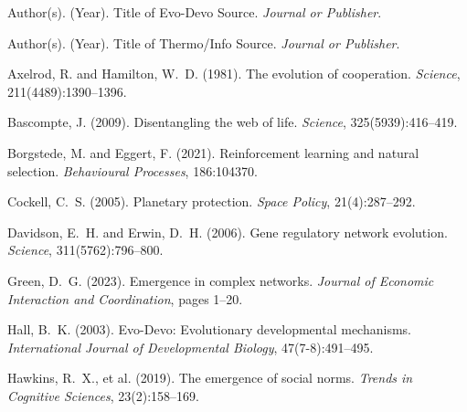 
\cleardoublepage %


\begin{thebibliography}{}

Author(s). (Year).
\newblock Title of Evo-Devo Source.
\newblock \emph{Journal or Publisher}.

Author(s). (Year).
\newblock Title of Thermo/Info Source.
\newblock \emph{Journal or Publisher}.

Axelrod, R. and Hamilton, W.~D. (1981).
\newblock The evolution of cooperation.
\newblock \emph{Science}, 211(4489):1390--1396.

Bascompte, J. (2009).
\newblock Disentangling the web of life.
\newblock \emph{Science}, 325(5939):416--419.

Borgstede, M. and Eggert, F. (2021).
\newblock Reinforcement learning and natural selection.
\newblock \emph{Behavioural Processes}, 186:104370.

Cockell, C.~S. (2005).
\newblock Planetary protection.
\newblock \emph{Space Policy}, 21(4):287--292.

Davidson, E.~H. and Erwin, D.~H. (2006).
\newblock Gene regulatory network evolution.
\newblock \emph{Science}, 311(5762):796--800.

Green, D.~G. (2023).
\newblock Emergence in complex networks.
\newblock \emph{Journal of Economic Interaction and Coordination}, pages 1--20.

Hall, B.~K. (2003).
\newblock Evo-Devo: Evolutionary developmental mechanisms.
\newblock \emph{International Journal of Developmental Biology}, 47(7-8):491--495.

Hawkins, R.~X., et al. (2019).
\newblock The emergence of social norms.
\newblock \emph{Trends in Cognitive Sciences}, 23(2):158--169.


\end{thebibliography}
